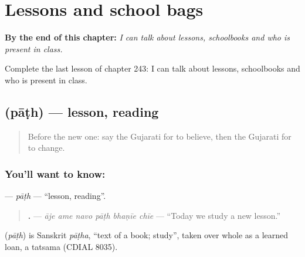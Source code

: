 
\chapter{Lessons and school bags}
\label{ch:gu-lessons-and-school-bags}

\begin{chapteropening}
\textbf{By the end of this chapter:} \emph{I can talk about lessons, schoolbooks and who is present in class.}

Complete the last lesson of chapter 243: I can talk about lessons, schoolbooks and who is present in class.
\end{chapteropening}

\section[\texorpdfstring{\gu{પાઠ} (pāṭh)}{પાઠ (pāṭh)}]{ (pāṭh) — lesson, reading}

\label{lesson:GU-C243-path}



\begin{quote}
Before the new one: say the Gujarati for to believe, then the Gujarati for to change.
\end{quote}

\subsection*{You'll want to know: }
\textbf{} — \emph{pāṭh} — \textquotedblleft{}lesson, reading\textquotedblright{}.

\begin{quote}
\textbf{     .} — \emph{āje ame navo pāṭh bhaṇīe chīe} — \textquotedblleft{}Today we study a new lesson.\textquotedblright{}
\end{quote}

\begin{cousinweb}
\textbf{} (\emph{pāṭh}) is Sanskrit \emph{pāṭha}, \textquotedblleft{}text of a book; study\textquotedblright{}, taken over whole as a learned loan, a tatsama (CDIAL 8035).
\end{cousinweb}

